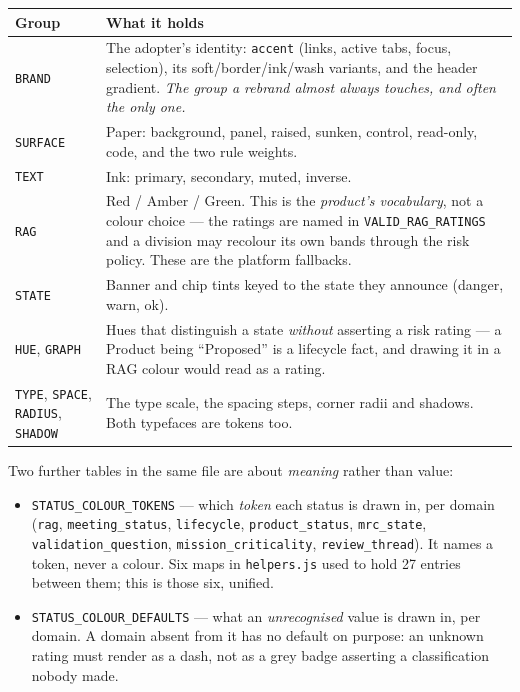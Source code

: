 \documentclass[11pt]{article}
\begin{document}
\begin{longtable}{@{}p{}p{}@{}}
\toprule
\textbf{Group} & \textbf{What it holds} \\
\midrule
\endhead
\texttt{BRAND} & The adopter's identity: \texttt{accent} (links, active tabs, focus,
  selection), its soft/border/ink/wash variants, and the header gradient. \emph{The group a
  rebrand almost always touches, and often the only one.} \\
\texttt{SURFACE} & Paper: background, panel, raised, sunken, control, read-only, code,
  and the two rule weights. \\
\texttt{TEXT} & Ink: primary, secondary, muted, inverse. \\
\texttt{RAG} & Red / Amber / Green. This is the \emph{product's vocabulary}, not a colour
  choice --- the ratings are named in \texttt{VALID\_RAG\_RATINGS} and a division may
  recolour its own bands through the risk policy. These are the platform fallbacks. \\
\texttt{STATE} & Banner and chip tints keyed to the state they announce (danger, warn,
  ok). \\
\texttt{HUE}, \texttt{GRAPH} & Hues that distinguish a state \emph{without} asserting a
  risk rating --- a Product being ``Proposed'' is a lifecycle fact, and drawing it in a RAG
  colour would read as a rating. \\
\texttt{TYPE}, \texttt{SPACE}, \texttt{RADIUS}, \texttt{SHADOW} & The type scale, the
  spacing steps, corner radii and shadows. Both typefaces are tokens too. \\
\bottomrule
\end{longtable}

Two further tables in the same file are about \emph{meaning} rather than value:

\begin{itemize}
  \item \texttt{STATUS\_COLOUR\_TOKENS} --- which \emph{token} each status is drawn in, per
        domain (\texttt{rag}, \texttt{meeting\_status}, \texttt{lifecycle},
        \texttt{product\_status}, \texttt{mrc\_state}, \texttt{validation\_question},
        \texttt{mission\_criticality}, \texttt{review\_thread}). It names a token, never a
        colour. Six maps in \texttt{helpers.js} used to hold 27 entries between them; this
        is those six, unified.
  \item \texttt{STATUS\_COLOUR\_DEFAULTS} --- what an \emph{unrecognised} value is drawn in,
        per domain. A domain absent from it has no default on purpose: an unknown rating
        must render as a dash, not as a grey badge asserting a classification nobody made.
\end{itemize}
\end{document}

